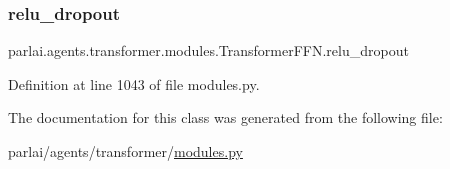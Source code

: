 \subsubsection{\texorpdfstring{relu\+\_\+dropout}{relu\_dropout}}
{\footnotesize\ttfamily parlai.\+agents.\+transformer.\+modules.\+Transformer\+F\+F\+N.\+relu\+\_\+dropout}



Definition at line 1043 of file modules.\+py.



The documentation for this class was generated from the following file\+:\begin{DoxyCompactItemize}
\item 
parlai/agents/transformer/\hyperlink{parlai_2agents_2transformer_2modules_8py}{modules.\+py}\end{DoxyCompactItemize}
